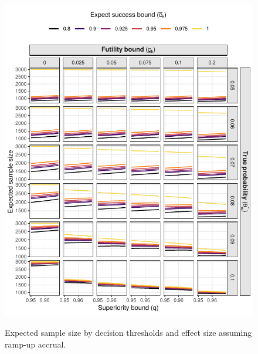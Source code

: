 \documentclass{article}
\begin{document}
\begin{figure}[!ht]
	\caption{Expected sample size by decision thresholds and effect size assuming ramp-up accrual.}
	\includegraphics{expected_ss_5.pdf}
	\label{fig:expected_ss_rampup}
\end{figure}
\end{document}
